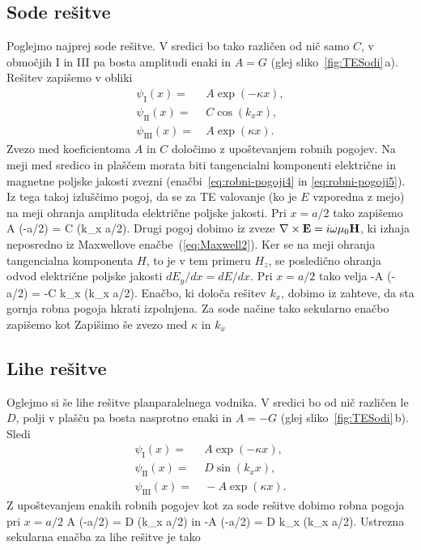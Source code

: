\subsection*{Sode rešitve}
Poglejmo najprej sode rešitve. V sredici bo tako različen od nič samo $C$, 
v območjih I in III pa bosta amplitudi enaki in $A = G$ (glej sliko~\ref{fig:TESodi}\,a). 
Rešitev zapišemo v obliki
\begin{align}
\psi_{\mathrm{I}}(x) =&~ A \exp(-\kappa x), \\
\psi_{\mathrm{II}}(x) =&~ C \cos(k_x x),\\
\psi_{\mathrm{III}}(x) =&~ A \exp(\kappa x).
\end{align}
Zvezo med koeficientoma $A$ in $C$ določimo z upoštevanjem robnih pogojev. Na meji
med sredico in plaščem morata biti tangencialni komponenti 
električne in magnetne poljske jakosti zvezni (enačbi~\ref{eq:robni-pogoji4} in 
\ref{eq:robni-pogoji5}). Iz tega takoj 
izluščimo pogoj, da se za TE valovanje (ko je $E$ vzporedna z mejo) 
na meji ohranja amplituda električne poljske jakosti. Pri $x = a/2$ tako zapišemo
\beq
A \exp(-\kappa a/2) = C \cos(k_x a/2).
\eeq
Drugi pogoj dobimo iz zveze $\nabla\times{\bf E}=i\omega\mu_{0}{\bf H}$, ki izhaja
neposredno iz Maxwellove enačbe~(\ref{eq:Maxwell2}). Ker se na meji ohranja
tangencialna komponenta $H$, to je v tem primeru $H_z$, se posledično ohranja 
odvod električne poljske jakosti $dE_y/dx = dE/dx$. 
Pri $x = a/2$ tako velja
\beq
-A \kappa \exp(-\kappa a/2) = -C k_x \sin(k_x a/2).
\eeq
Enačbo, ki določa rešitev $k_x$, dobimo iz zahteve, da sta gornja robna 
pogoja hkrati izpolnjena. Za sode načine tako sekularno enačbo zapišemo kot
Zapišimo še zvezo med $\kappa$ in $k_x$ 
\subsection*{Lihe rešitve}
Oglejmo si še lihe rešitve planparalelnega vodnika. V sredici bo od nič različen
le $D$, polji v plašču pa bosta nasprotno enaki in $A = -G$ (glej sliko~\ref{fig:TESodi}\,b). Sledi
\begin{align}
\psi_{\mathrm{I}}(x) =&~ A \exp(-\kappa x),\\
\psi_{\mathrm{II}}(x) =&~ D \sin(k_x x),\\
\psi_{\mathrm{III}}(x) =&~ -A \exp(\kappa x).
\end{align}
Z upoštevanjem enakih robnih pogojev kot za sode rešitve dobimo robna pogoja pri $x=a/2$
\beq
A \exp(-\kappa a/2) = D \sin(k_x a/2)
\eeq
in 
\beq
-\kappa A \exp(-\kappa a/2) = D k_x \cos(k_x a/2).
\eeq
Ustrezna sekularna enačba za lihe rešitve je tako

